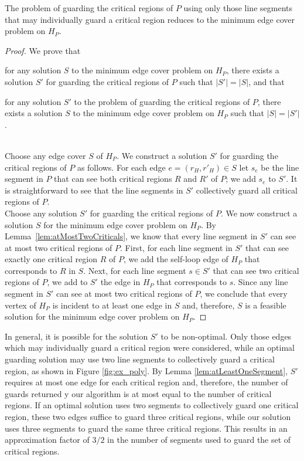 \documentclass{llncs}
\begin{document}
\begin{lemma}
\label{lem:criticalEdgeCoverEquivalence}
The problem of guarding the critical regions of $P$ using only those line segments that may individually guard a critical region reduces to the minimum edge cover problem on $H_P$.
\end{lemma}
\begin{proof}
We prove that \begin{inparaenum}[(i)]\item for any solution $S$ to the minimum edge cover
problem on $H_P$, there exists a solution $S'$ for guarding the critical regions of $P$ such
that $\lvert S'\rvert=\lvert S\rvert$, and that \item for any solution $S'$ to the problem of guarding
the critical regions of $P$, there exists a solution $S$ to the minimum edge cover problem on
$H_P$ such that $\lvert S\rvert=\lvert S'\rvert$. \end{inparaenum}\\

 Choose any edge cover $S$ of $H_P$. We construct a solution $S'$ for guarding the critical regions of $P$ as follows. For each edge
$e=(r_H, r'_H)\in S$ let $s_e$ be the line segment in $P$ that can see both critical
regions $R$ and $R'$ of $P$; we add $s_e$ to $S'$. It is straightforward to see that
the line segments in $S'$ collectively guard all critical regions of $P$.\\

 Choose any solution $S'$ for guarding the critical regions of $P$. We
now construct a solution $S$ for the minimum edge cover problem on $H_P$. By Lemma~\ref{lem:atMostTwoCriticals},
we know that every line segment in $S'$ can see at most two critical regions of $P$.
First, for each line segment in $S'$ that can see exactly one critical region $R$ of $P$, we add the
self-loop edge of $H_P$ that corresponds to $R$ in $S$. Next, for each line segment $s\in S'$ that
can see two critical regions of $P$, we add to $S'$ the edge in $H_P$ that corresponds to $s$.
Since any line segment in $S'$ can see at most two critical regions of $P$, we conclude that every
vertex of $H_P$ is incident to at least one edge in $S$ and, therefore, $S$ is a feasible solution for
the minimum edge cover problem on $H_P$.
\end{proof}

In general, it is possible for the solution $S'$ to be non-optimal. Only those edges which may individually guard a critical region were considered, while an optimal guarding solution may use two line segments to collectively guard a critical region, as shown in Figure \ref{fig:ex_poly}. By Lemma \ref{lem:atLeastOneSegment}, $S'$ requires at most one edge for each critical region and,
therefore, the number of guards returned y our algorithm is at most equal to the number of critical regions.
If an optimal solution uses two segments to collectively guard one critical region, 
these two edges suffice to guard three critical regions, while our solution uses three segments to guard the same three
critical regions. This results in an approximation factor of $3/2$ in the number of segments used to guard 
the set of critical regions.
\end{document}
